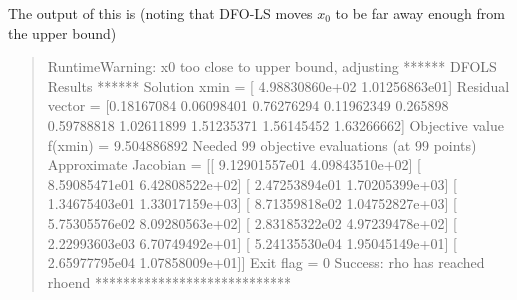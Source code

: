 \documentclass[letterpaper,10pt,english]{sphinxmanual}
\begin{document}
\begin{quote}
\begin{sphinxVerbatim}[commandchars=\\\{\}]
  \PYG{p}{[} \PYG{p}{]}


  \PYG{p}{[} \PYG{p}{]}

     

\end{sphinxVerbatim}
\end{quote}

The output of this is (noting that DFO-LS moves \(x_0\) to be far away enough from the upper bound)
\begin{quote}

\begin{sphinxVerbatim}[commandchars=\\\{\}]
RuntimeWarning: x0 too close to upper bound, adjusting
****** DFO\PYGZhy{}LS Results ******
Solution xmin = [  4.98830860e+02  \PYGZhy{}1.01256863e\PYGZhy{}01]
Residual vector = [\PYGZhy{}0.18167084  0.06098401  0.76276294  0.11962349 \PYGZhy{}0.265898   \PYGZhy{}0.59788818
 \PYGZhy{}1.02611899 \PYGZhy{}1.51235371 \PYGZhy{}1.56145452 \PYGZhy{}1.63266662]
Objective value f(xmin) = 9.504886892
Needed 99 objective evaluations (at 99 points)
Approximate Jacobian = [[ \PYGZhy{}9.12901557e\PYGZhy{}01  \PYGZhy{}4.09843510e+02]
 [ \PYGZhy{}8.59085471e\PYGZhy{}01  \PYGZhy{}6.42808522e+02]
 [ \PYGZhy{}2.47253894e\PYGZhy{}01  \PYGZhy{}1.70205399e+03]
 [ \PYGZhy{}1.34675403e\PYGZhy{}01  \PYGZhy{}1.33017159e+03]
 [ \PYGZhy{}8.71359818e\PYGZhy{}02  \PYGZhy{}1.04752827e+03]
 [ \PYGZhy{}5.75305576e\PYGZhy{}02  \PYGZhy{}8.09280563e+02]
 [ \PYGZhy{}2.83185322e\PYGZhy{}02  \PYGZhy{}4.97239478e+02]
 [ \PYGZhy{}2.22993603e\PYGZhy{}03  \PYGZhy{}6.70749492e+01]
 [ \PYGZhy{}5.24135530e\PYGZhy{}04  \PYGZhy{}1.95045149e+01]
 [ \PYGZhy{}2.65977795e\PYGZhy{}04  \PYGZhy{}1.07858009e+01]]
Exit flag = 0
Success: rho has reached rhoend
****************************
\end{sphinxVerbatim}
\end{quote}
\end{document}

